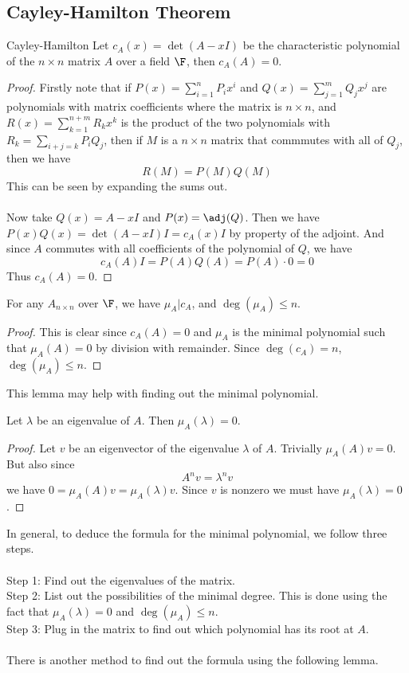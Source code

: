 \subsection{Cayley-Hamilton Theorem}
\begin{thm}{Cayley-Hamilton}{} Let $c_A(x)=\det(A-xI)$ be the characteristic polynomial of the $n\times n$ matrix $A$ over a field $\F$, then $c_A(A)=0$. \tcbline
\begin{proof} Firstly note that if $P(x)=\sum_{i=1}^nP_ix^i$ and $Q(x)=\sum_{j=1}^mQ_jx^j$ are polynomials with matrix coefficients where the matrix is $n\times n$, and $R(x)=\sum_{k=1}^{n+m}R_kx^k$ is the product of the two polynomials with $R_k=\sum_{i+j=k}P_iQ_j$, then if $M$ is a $n\times n$ matrix that commmutes with all of $Q_j$, then we have $$R(M)=P(M)Q(M)$$
This can be seen by expanding the sums out. \\~\\
Now take $Q(x)=A-xI$ and $P(x)=\adj(Q)$. Then we have $P(x)Q(x)=\det(A-xI)I=c_A(x)I$ by property of the adjoint. And since $A$ commutes with all coefficients of the polynomial of $Q$, we have $$c_A(A)I=P(A)Q(A)=P(A)\cdot 0=0$$ Thus $c_A(A)=0$. 
\end{proof}
\end{thm}

\begin{crl}{}{} For any $A_{n\times n}$ over $\F$, we have $\mu_A|c_A$, and $\deg(\mu_A)\leq n$. \tcbline
\begin{proof}
This is clear since $c_A(A)=0$ and $\mu_A$ is the minimal polynomial such that $\mu_A(A)=0$ by division with remainder. Since $\deg(c_A)=n$, $\deg(\mu_A)\leq n$. 
\end{proof}
\end{crl}

This lemma may help with finding out the minimal polynomial. 

\begin{lmm}{}{} Let $\lambda$ be an eigenvalue of $A$. Then $\mu_A(\lambda)=0$. \tcbline
\begin{proof}
Let $v$ be an eigenvector of the eigenvalue $\lambda$ of $A$. Trivially $\mu_A(A)v=0$. But also since $$A^nv=\lambda^nv$$ we have $0=\mu_A(A)v=\mu_A(\lambda)v$. Since $v$ is nonzero we must have $\mu_A(\lambda)=0$. 
\end{proof}
\end{lmm}

In general, to deduce the formula for the minimal polynomial, we follow three steps. \\~\\
Step 1: Find out the eigenvalues of the matrix. \\
Step 2: List out the possibilities of the minimal degree. This is done using the fact that $\mu_A(\lambda)=0$ and $\deg(\mu_A)\leq n$. \\
Step 3: Plug in the matrix to find out which polynomial has its root at $A$. \\~\\
There is another method to find out the formula using the following lemma. 

